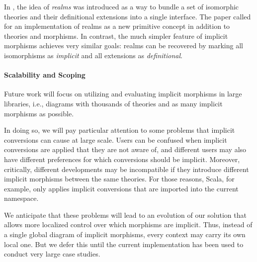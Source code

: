 In \cite{realms}, the idea of \emph{realms} was introduced as a way to bundle a set of isomorphic theories and their definitional extensions into a single interface.
The paper called for an implementation of realms as a new primitive concept in addition to theories and morphisms.
In contrast, the much simpler feature of implicit morphisms achieves very similar goals: realms can be recovered by marking all isomorphisms as \emph{implicit} and all extensions as \emph{definitional}.

%

\paragraph{Scalability and Scoping}
Future work will focus on utilizing and evaluating implicit morphisms in large libraries, i.e., diagrams with thousands of theories and as many implicit morphisms as possible.

In doing so, we will pay particular attention to some problems that implicit conversions can cause at large scale.
Users can be confused when implicit conversions are applied that they are not aware of, and different users may also have different preferences for which conversions should be implicit.
Moreover, critically, different developments may be incompatible if they introduce different implicit morphisms between the same theories.
For those reasons, Scala, for example, only applies implicit conversions that are imported into the current namespace.

We anticipate that these problems will lead to an evolution of our solution that allows more localized control over which morphisms are implicit.
Thus, instead of a single global diagram of implicit morphisms, every context may carry its own local one.
But we defer this until the current implementation has been used to conduct very large case studies.


